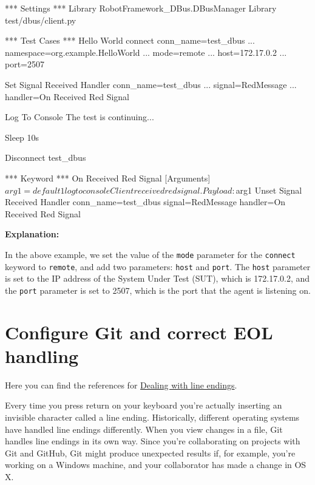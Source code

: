 \begin{robotcode}
*** Settings ***
Library    RobotFramework_DBus.DBusManager
Library    test/dbus/client.py
 
*** Test Cases ***
Hello World
   connect    conn_name=test_dbus
   ...        namespace=org.example.HelloWorld
   ...        mode=remote
   ...        host=172.17.0.2
   ...        port=2507

   Set Signal Received Handler    conn_name=test_dbus    
   ...                            signal=RedMessage    
   ...                            handler=On Received Red Signal
   
   Log To Console    The test is continuing...

   Sleep    10s
   
   Disconnect    test_dbus

*** Keyword ***
On Received Red Signal
   [Arguments]    ${arg1}=default 1
   log to console      Client received red signal. Payload: ${arg1}
   Unset Signal Received Handler    conn_name=test_dbus    signal=RedMessage    handler=On Received Red Signal
\end{robotcode}

\textbf{Explanation:}

In the above example, we set the value of the \texttt{mode} parameter for the \texttt{connect} keyword to \texttt{remote}, and add two parameters: \texttt{host} 
and \texttt{port}. The \texttt{host} parameter is set to the IP address of the System Under Test (SUT), which is 172.17.0.2, and the \texttt{port} parameter is set 
to 2507, which is the port that the agent is listening on.


\hypertarget{configure-git-and-correct-eol-handling}{%
\section{Configure Git and correct EOL
handling}\label{configure-git-and-correct-eol-handling}}

Here you can find the references for
\href{https://help.github.com/articles/dealing-with-line-endings/}{Dealing
with line endings}.

Every time you press return on your keyboard you're actually inserting
an invisible character called a line ending. Historically, different
operating systems have handled line endings differently. When you view
changes in a file, Git handles line endings in its own way. Since you're
collaborating on projects with Git and GitHub, Git might produce
unexpected results if, for example, you're working on a Windows machine,
and your collaborator has made a change in OS X.


